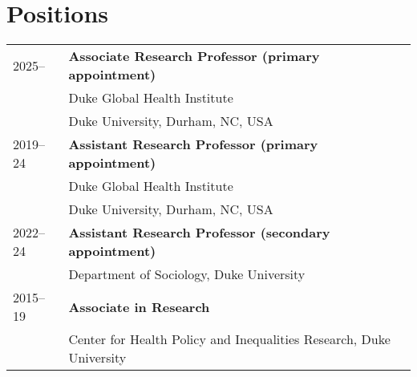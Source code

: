 \vspace{2ex}
\section*{Positions}
\begin{longtable}{p{} p{}}
2025-- & \textbf{Associate Research Professor (primary appointment)}\\
				& Duke Global Health Institute\\
				&Duke University, Durham, NC, USA \\

2019--24 & \textbf{Assistant Research Professor (primary appointment)}\\
		             & Duke Global Health Institute\\
		             &Duke University, Durham, NC, USA \\
		             
		             2022--24 & \textbf{Assistant Research Professor (secondary appointment)}\\
		             & Department of Sociology, Duke University \\
		             
2015--19 & \textbf{Associate in Research}\\
& Center for Health Policy and Inequalities Research, Duke University\\

\end{longtable}

